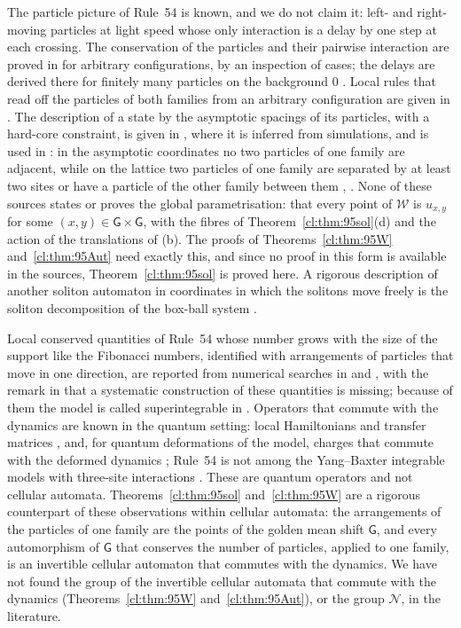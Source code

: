 The particle picture of Rule~54 is known, and we do not claim it: left- and right-moving particles at light speed whose only interaction is a delay by one step at each crossing. The conservation of the particles and their pairwise interaction are proved in \cite[Theorem~1, Corollary~1]{BBGP1993} for arbitrary configurations, by an inspection of cases; the delays are derived there for finitely many particles on the background $0$ \cite[Corollary~2]{BBGP1993}. Local rules that read off the particles of both families from an arbitrary configuration are given in \cite{GHKV2018,ADM2019,FGV2019,KlobasThesis}. The description of a state by the asymptotic spacings of its particles, with a hard-core constraint, is given in \cite{Gopalakrishnan2018}, where it is inferred from simulations, and is used in \cite{FGV2019}: in the asymptotic coordinates no two particles of one family are adjacent, while on the lattice two particles of one family are separated by at least two sites or have a particle of the other family between them \cite{FGV2019}, \cite[Section~6.1]{BKP2021}. None of these sources states or proves the global parametrisation: that every point of $\mathcal W$ is $u_{x,y}$ for some $(x,y)\in\mathsf G\times\mathsf G$, with the fibres of Theorem~\ref{cl:thm:95sol}(d) and the action of the translations of (b). The proofs of Theorems~\ref{cl:thm:95W} and~\ref{cl:thm:95Aut} need exactly this, and since no proof in this form is available in the sources, Theorem~\ref{cl:thm:95sol} is proved here. A rigorous description of another soliton automaton in coordinates in which the solitons move freely is the soliton decomposition of the box-ball system \cite{FNRW2021}.

Local conserved quantities of Rule~54 whose number grows with the size of the support like the Fibonacci numbers, identified with arrangements of particles that move in one direction, are reported from numerical searches in \cite[Section~2.2.3]{KlobasThesis} and \cite[Section~3.3]{BKP2021}, with the remark in \cite{KlobasThesis} that a systematic construction of these quantities is missing; because of them the model is called superintegrable in \cite{GP2022,GP2024,PP2026}. Operators that commute with the dynamics are known in the quantum setting: local Hamiltonians \cite{FGV2019,GP2024} and transfer matrices \cite{GP2024}, and, for quantum deformations of the model, charges that commute with the deformed dynamics \cite{PP2026}; Rule~54 is not among the Yang--Baxter integrable models with three-site interactions \cite{GP2021}. These are quantum operators and not cellular automata. Theorems~\ref{cl:thm:95sol} and~\ref{cl:thm:95W} are a rigorous counterpart of these observations within cellular automata: the arrangements of the particles of one family are the points of the golden mean shift $\mathsf G$, and every automorphism of $\mathsf G$ that conserves the number of particles, applied to one family, is an invertible cellular automaton that commutes with the dynamics. We have not found the group of the invertible cellular automata that commute with the dynamics (Theorems~\ref{cl:thm:95W} and~\ref{cl:thm:95Aut}), or the group $\mathcal N$, in the literature.

